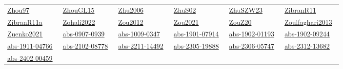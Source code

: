\begin{longtable}{*{6}{l}}
\href{../scheduling/works/Zhou97.pdf}{Zhou97}~\cite{Zhou97} & \href{../scheduling/works/ZhouGL15.pdf}{ZhouGL15}~\cite{ZhouGL15} & \href{../}{Zhu2006}~\cite{Zhu2006} & \href{../scheduling/works/ZhuS02.pdf}{ZhuS02}~\cite{ZhuS02} & \href{../scheduling/works/ZhuSZW23.pdf}{ZhuSZW23}~\cite{ZhuSZW23} & \href{../scheduling/works/ZibranR11.pdf}{ZibranR11}~\cite{ZibranR11}\\ 
\href{../scheduling/works/ZibranR11a.pdf}{ZibranR11a}~\cite{ZibranR11a} & \href{../}{Zohali2022}~\cite{Zohali2022} & \href{../scheduling/works/Zou2012.pdf}{Zou2012}~\cite{Zou2012} & \href{../scheduling/works/Zou2021.pdf}{Zou2021}~\cite{Zou2021} & \href{../scheduling/works/ZouZ20.pdf}{ZouZ20}~\cite{ZouZ20} & \href{../}{Zoulfaghari2013}~\cite{Zoulfaghari2013}\\ 
\href{../scheduling/works/Zuenko2021.pdf}{Zuenko2021}~\cite{Zuenko2021} & \href{../scheduling/works/abs-0907-0939.pdf}{abs-0907-0939}~\cite{abs-0907-0939} & \href{../scheduling/works/abs-1009-0347.pdf}{abs-1009-0347}~\cite{abs-1009-0347} & \href{../scheduling/works/abs-1901-07914.pdf}{abs-1901-07914}~\cite{abs-1901-07914} & \href{../scheduling/works/abs-1902-01193.pdf}{abs-1902-01193}~\cite{abs-1902-01193} & \href{../scheduling/works/abs-1902-09244.pdf}{abs-1902-09244}~\cite{abs-1902-09244}\\ 
\href{../scheduling/works/abs-1911-04766.pdf}{abs-1911-04766}~\cite{abs-1911-04766} & \href{../scheduling/works/abs-2102-08778.pdf}{abs-2102-08778}~\cite{abs-2102-08778} & \href{../scheduling/works/abs-2211-14492.pdf}{abs-2211-14492}~\cite{abs-2211-14492} & \href{../scheduling/works/abs-2305-19888.pdf}{abs-2305-19888}~\cite{abs-2305-19888} & \href{../scheduling/works/abs-2306-05747.pdf}{abs-2306-05747}~\cite{abs-2306-05747} & \href{../scheduling/works/abs-2312-13682.pdf}{abs-2312-13682}~\cite{abs-2312-13682}\\ 
\href{../scheduling/works/abs-2402-00459.pdf}{abs-2402-00459}~\cite{abs-2402-00459} & \end{longtable}
